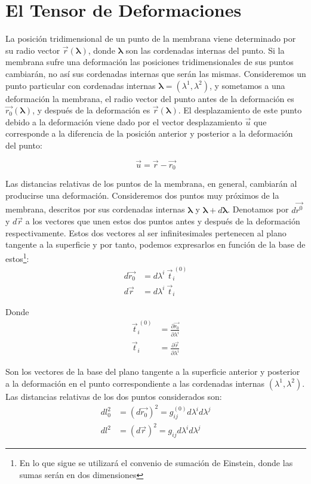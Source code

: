 \section{El Tensor de Deformaciones}
La posición tridimensional de un punto de la membrana viene determinado por su
radio vector $\vec{r}(\boldsymbol{\lambda})$, donde
$\boldsymbol{\lambda}$ son las cordenadas internas del
punto. Si la membrana sufre una deformación las posiciones tridimensionales de
sus puntos cambiarán, no así sus cordenadas internas que serán las
mismas. Consideremos un punto particular con cordenadas internas $\boldsymbol{\lambda}=(\lambda^1,\lambda^2)$, y sometamos a una deformación la membrana, el
radio vector del punto antes de la deformación es
$\vec{r_0}(\boldsymbol{\lambda})$, y después de la deformación es
$\vec{r}(\boldsymbol{\lambda})$. El desplazamiento de este punto debido a la
deformación viene dado por el vector desplazamiento $\vec{u}$ que corresponde
a la diferencia de la posición anterior y posterior a la deformación del punto: 

\begin{equation}\label{vector_u}
\vec{u}=\vec{r}-\vec{r_0}
\end{equation}

Las distancias relativas de los puntos de la membrana, en general, cambiarán
al producirse una deformación. Consideremos dos puntos muy próximos de la
membrana, descritos por sus cordenadas internas $\boldsymbol{\lambda}$ y
$\boldsymbol{\lambda}+d\boldsymbol{\lambda}$. Denotamos por $d\vec{r^0}$ y
$d\vec{r}$ a los vectores que unen estos dos puntos antes y después de la
deformación respectivamente. Estos dos vectores al ser infinitesimales
pertenecen al plano tangente a la superficie y por tanto, podemos expresarlos
en función de la base de estos\footnote{En lo que sigue se utilizará el
  convenio de sumación de Einstein, donde las sumas serán en dos dimensiones}:
\begin{align}
d\vec{r_0}&=d\lambda^i \ \vec{t}^{\ (0)}_i\label{dr0_vectorial}\\
d\vec{r}&=d\lambda^i \ \vec{t}_i
\end{align}

Donde
\begin{align*}
\vec{t}^{\ (0)}_i&=\frac{\partial \vec{r_0}}{\partial \lambda^i}\\
\vec{t}_i&=\frac{\partial \vec{r}}{\partial \lambda^i}
\end{align*}

Son los vectores de la base del plano tangente a la superficie anterior y
posterior a la deformación en el punto correspondiente a las cordenadas
internas $(\lambda^1,\lambda^2)$. Las distancias relativas de los dos puntos
considerados son: 
\begin{align}
dl^2_0&=(d\vec{r_0})^2=g^{(0)}_{ij}d\lambda^id\lambda^j\label{dl0}\\
dl^2&=(d\vec{r})^2=g_{ij}d\lambda^id\lambda^j
\end{align}

